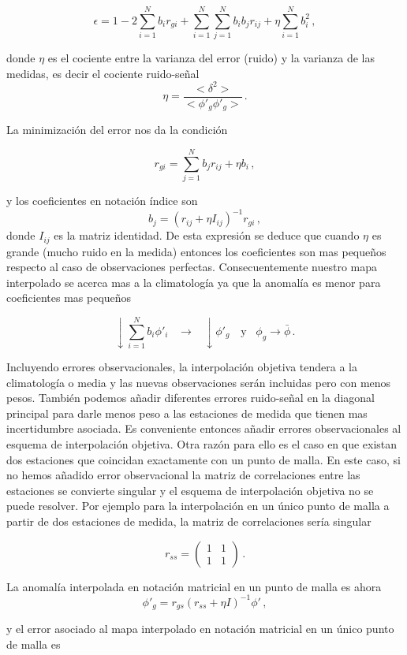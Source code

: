 \documentclass[
]{agujournal2019}
\begin{document}
\[\epsilon=1-2 \sum\limits^N_{i=1} b_i r_{gi} + \sum\limits^N_{i=1}\sum\limits^N_{j=1} b_i b_j r_{ij} + \eta\sum\limits_{i=1}^N b_i^2\,,\]

donde \(\eta\) es el cociente entre la varianza del error (ruido) y la
varianza de las medidas, es decir el cociente ruido-señal
\[\eta=\frac{<\delta^2>}{<\phi'_g\phi'_g>}\,.\]

La minimización del error nos da la condición

\[r_{gi}=\sum\limits^N_{j=1}b_j r_{ij}+\eta b_i\,,\]

y los coeficientes en notación índice son
\[b_j=(r_{ij} + \eta I_{ij})^{-1}r_{gi}\,,\] donde \(I_{ij}\) es la
matriz identidad. De esta expresión se deduce que cuando \(\eta\) es
grande (mucho ruido en la medida) entonces los coeficientes son mas
pequeños respecto al caso de observaciones perfectas. Consecuentemente
nuestro mapa interpolado se acerca mas a la climatología ya que la
anomalía es menor para coeficientes mas pequeños

\[\downarrow \sum\limits^N_{i=1}b_i\phi'_i \,\,\,\,\,\rightarrow \,\,\,\,\,\downarrow\phi'_g\,\,\,\,\,\,\text{y}\,\,\,\,\,\phi_g\rightarrow\bar{\phi}\,.\]

Incluyendo errores observacionales, la interpolación objetiva tendera a
la climatología o media y las nuevas observaciones serán incluidas pero
con menos pesos. También podemos añadir diferentes errores ruido-señal
en la diagonal principal para darle menos peso a las estaciones de
medida que tienen mas incertidumbre asociada. Es conveniente entonces
añadir errores observacionales al esquema de interpolación objetiva.
Otra razón para ello es el caso en que existan dos estaciones que
coincidan exactamente con un punto de malla. En este caso, si no hemos
añadido error observacional la matriz de correlaciones entre las
estaciones se convierte singular y el esquema de interpolación objetiva
no se puede resolver. Por ejemplo para la interpolación en un único
punto de malla a partir de dos estaciones de medida, la matriz de
correlaciones sería singular

\[r_{ss}=
       \left(\begin{array}{cc}
  1 & 1 \\
  1 & 1
     \end{array}\right)\,.\]

La anomalía interpolada en notación matricial en un punto de malla es
ahora \[\phi'_g=r_{gs}(r_{ss}+\eta I)^{-1}\phi'\,,\]

y el error asociado al mapa interpolado en notación matricial en un
único punto de malla es
\end{document}
